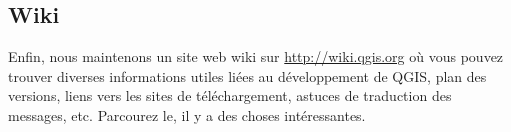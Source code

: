 \subsection{Wiki}
Enfin, nous maintenons un site web wiki sur \url{http://wiki.qgis.org} o\`u vous
pouvez trouver diverses informations utiles li\'ees au d\'eveloppement de QGIS, plan
des versions, liens vers les sites de t\'el\'echargement, astuces de
traduction des messages, etc. Parcourez le, il y a des choses int\'eressantes.
